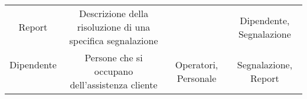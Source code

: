 \begin{center}
\begin{tabular}{ |c|c|c|c|}
\multirow{3}{6em}{Report} & \multirow{3}{12em}{Descrizione della risoluzione di una specifica segnalazione} & \multirow{3}{8em}{} & \multirow{3}{12em}{Dipendente, Segnalazione} \\
&  &  & \\
&  &  & \\ 
\hline

\multirow{0}{6em}{Dipendente} & \multirow{3}{12em}{Persone che si occupano dell'assistenza cliente} & \multirow{3}{8em}{Operatori, Personale} & \multirow{3}{12em}{Segnalazione, Report} \\
&  &  & \\
&  &  & \\ 
\hline

\end{tabular}
\end{center}